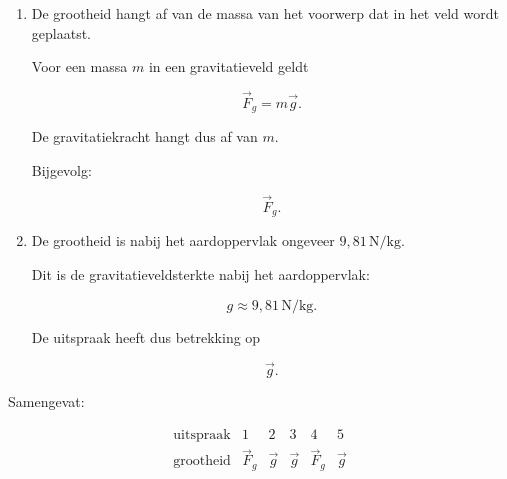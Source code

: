 \documentclass{ximera}
\begin{document}
\begin{oefening}{\oefB\ESS}
\begin{oplossing}
\begin{enumerate}
        Het gravitatieveld beschrijft de invloed van de aarde in een punt
        van de ruimte, ook wanneer daar geen testmassa aanwezig is.
      
        Dus:
      
        \[
        \boxed{\vec g}.
        \]
      
      
        \item De grootheid hangt af van de massa van het voorwerp dat in
        het veld wordt geplaatst.
      
        Voor een massa $m$ in een gravitatieveld geldt
      
        \[
        \vec F_g=m\vec g.
        \]
      
        De gravitatiekracht hangt dus af van $m$.
      
        Bijgevolg:
      
        \[
        \boxed{\vec F_g}.
        \]
      
      
        \item De grootheid is nabij het aardoppervlak ongeveer
        $9{,}81\,\mathrm{N/kg}$.
      
        Dit is de gravitatieveldsterkte nabij het aardoppervlak:
      
        \[
        \boxed{
        g\approx9{,}81\,\mathrm{N/kg}.
        }
        \]
      
        De uitspraak heeft dus betrekking op
      
        \[
        \boxed{\vec g}.
        \]
      
      \end{enumerate}
      
      Samengevat:
      
      \[
      \boxed{
      \begin{array}{c|ccccc}
      \text{uitspraak} & 1 & 2 & 3 & 4 & 5\\
      \hline
      \text{grootheid}
      & \vec F_g
      & \vec g
      & \vec g
      & \vec F_g
      & \vec g
      \end{array}
      }
      \]
      
      \end{oplossing}
\end{oefening}



\end{document}

